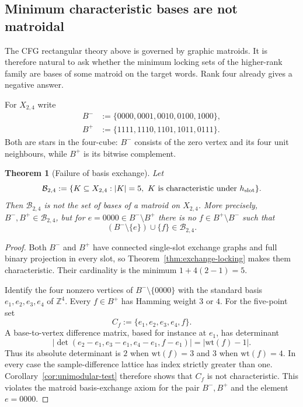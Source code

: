 \documentclass[11pt]{article}
\newtheorem{theorem}[definition]{Theorem}
\begin{document}
\subsection{Minimum characteristic bases are not matroidal}
\label{subsec:nonmatroid}

The CFG rectangular theory above is governed by graphic matroids.  It is
therefore natural to ask whether the minimum locking sets of the higher-rank
family are bases of some matroid on the target words.  Rank four already gives
a negative answer.

For $X_{2,4}$ write
\[
\begin{aligned}
 B^-&:=\{0000,0001,0010,0100,1000\},\\
 B^+&:=\{1111,1110,1101,1011,0111\}.
\end{aligned}
\]
Both are stars in the four-cube: $B^-$ consists of the zero vertex and its four
unit neighbours, while $B^+$ is its bitwise complement.

\begin{theorem}[Failure of basis exchange]
\label{thm:characteristic-bases-nonmatroid}
Let
\[
 \mathcal B_{2,4}
 :=\{K\subseteq X_{2,4}: |K|=5,
              \ K\text{ is characteristic under }h_{\rm slot}\}.
\]
Then $\mathcal B_{2,4}$ is not the set of bases of a matroid on $X_{2,4}$.
More precisely, $B^-,B^+\in\mathcal B_{2,4}$, but for
$e=0000\in B^-\setminus B^+$ there is no
$f\in B^+\setminus B^-$ such that
\[
  (B^-\setminus\{e\})\cup\{f\}
  \in\mathcal B_{2,4}.
\]
\end{theorem}

\begin{proof}
Both $B^-$ and $B^+$ have connected single-slot exchange graphs and full
binary projection in every slot, so
Theorem~\ref{thm:exchange-locking} makes them characteristic.  Their cardinality
is the minimum $1+4(2-1)=5$.

Identify the four nonzero vertices of $B^-\setminus\{0000\}$ with the standard
basis $e_1,e_2,e_3,e_4$ of $\mathbb Z^4$.  Every
$f\in B^+$ has Hamming weight $3$ or $4$.  For the five-point set
\[
  C_f:=\{e_1,e_2,e_3,e_4,f\}.
\]
A base-to-vertex difference matrix, based for instance at $e_1$, has determinant
\[
  \left|
  \det(e_2-e_1,e_3-e_1,e_4-e_1,f-e_1)
  \right|
  =|\mathrm{wt}(f)-1|.
\]
Thus its absolute determinant is $2$ when $\mathrm{wt}(f)=3$ and $3$ when
$\mathrm{wt}(f)=4$.  In every case the sample-difference lattice has index
strictly greater than one.  Corollary~\ref{cor:unimodular-test} therefore shows
that $C_f$ is not characteristic.  This violates the matroid basis-exchange
axiom for the pair $B^-,B^+$ and the element $e=0000$.
\end{proof}
\end{document}
